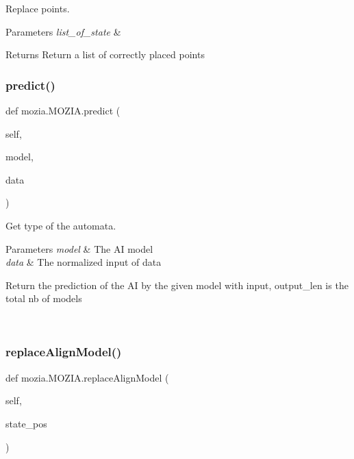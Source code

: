 Replace points. 


\begin{DoxyParams}{Parameters}
{\em list\+\_\+of\+\_\+state} & \\
\hline
\end{DoxyParams}
\begin{DoxyReturn}{Returns}
Return a list of correctly placed points 
\end{DoxyReturn}
\mbox{\label{classmozia_1_1MOZIA_a898fd2c5122142fafda0b85072b8111a}} 
\subsubsection{\texorpdfstring{predict()}{predict()}}
{\footnotesize\ttfamily def mozia.\+M\+O\+Z\+I\+A.\+predict (\begin{DoxyParamCaption}\item[{}]{self,  }\item[{}]{model,  }\item[{}]{data }\end{DoxyParamCaption})}



Get type of the automata. 


\begin{DoxyParams}{Parameters}
{\em model} & The AI model \\
\hline
{\em data} & The normalized input of data \begin{DoxyVerb}Return the prediction of the AI by the given model with input, output_len is the total nb of models\end{DoxyVerb}
 \\
\hline
\end{DoxyParams}
\mbox{\label{classmozia_1_1MOZIA_abc882fa3ab57d2e757933881b3555244}} 
\subsubsection{\texorpdfstring{replaceAlignModel()}{replaceAlignModel()}}
{\footnotesize\ttfamily def mozia.\+M\+O\+Z\+I\+A.\+replace\+Align\+Model (\begin{DoxyParamCaption}\item[{}]{self,  }\item[{}]{state\+\_\+pos }\end{DoxyParamCaption})}




